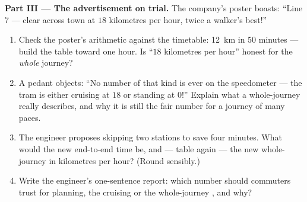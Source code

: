 \begin{problem}
\medskip\noindent\textbf{Part III --- The advertisement on trial.}
The company's poster boasts: ``Line 7 --- clear across town at
$18$ kilometres per hour, twice a walker's best!''
\begin{enumerate}[resume]
  \item Check the poster's arithmetic against the timetable:
        \qty{12}{km} in $50$ minutes --- build the table toward
        one hour. Is ``$18$ kilometres per hour'' honest for the
        \emph{whole} journey?
  \item A pedant objects: ``No number of that kind is ever on the
        speedometer --- the tram is either cruising at $18$ or
        standing at $0$!'' Explain what a whole-journey 
        really describes, and why it is still the fair number for
        a journey of many paces.
  \item The engineer proposes skipping two stations to save four
        minutes. What would the new end-to-end time be, and ---
        table again --- the new whole-journey  in kilometres
        per hour? (Round sensibly.)
  \item Write the engineer's one-sentence report: which number
        should commuters trust for planning, the cruising 
        or the whole-journey , and why?
\end{enumerate}
\end{problem}
